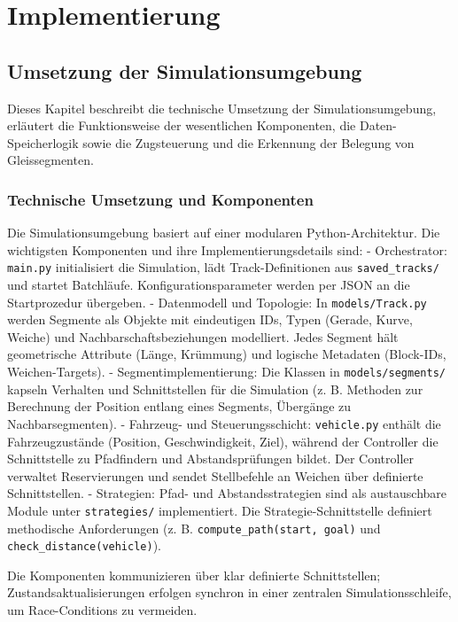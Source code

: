 \chapter{Implementierung}

\section{Umsetzung der Simulationsumgebung}
\label{ch:Implementierung:sec:Umsetzung der Simulationsumgebung}

Dieses Kapitel beschreibt die technische Umsetzung der Simulationsumgebung, erläutert die Funktionsweise der wesentlichen Komponenten, die Daten-Speicherlogik sowie die Zugsteuerung und die Erkennung der Belegung von Gleissegmenten.

\subsection*{Technische Umsetzung und Komponenten}
Die Simulationsumgebung basiert auf einer modularen Python-Architektur. Die wichtigsten Komponenten und ihre Implementierungsdetails sind:
- Orchestrator: \texttt{main.py} initialisiert die Simulation, lädt Track-Definitionen aus \texttt{saved\_tracks/} und startet Batchläufe. Konfigurationsparameter werden per JSON an die Startprozedur übergeben.
- Datenmodell und Topologie: In \texttt{models/Track.py} werden Segmente als Objekte mit eindeutigen IDs, Typen (Gerade, Kurve, Weiche) und Nachbarschaftsbeziehungen modelliert. Jedes Segment hält geometrische Attribute (Länge, Krümmung) und logische Metadaten (Block-IDs, Weichen-Targets).
- Segmentimplementierung: Die Klassen in \texttt{models/segments/} kapseln Verhalten und Schnittstellen für die Simulation (z. B. Methoden zur Berechnung der Position entlang eines Segments, Übergänge zu Nachbarsegmenten).
- Fahrzeug- und Steuerungsschicht: \texttt{vehicle.py} enthält die Fahrzeugzustände (Position, Geschwindigkeit, Ziel), während der Controller die Schnittstelle zu Pfadfindern und Abstandsprüfungen bildet. Der Controller verwaltet Reservierungen und sendet Stellbefehle an Weichen über definierte Schnittstellen.
- Strategien: Pfad- und Abstandsstrategien sind als austauschbare Module unter \texttt{strategies/} implementiert. Die Strategie-Schnittstelle definiert methodische Anforderungen (z. B. \texttt{compute\_path(start, goal)} und \texttt{check\_distance(vehicle)}).

Die Komponenten kommunizieren über klar definierte Schnittstellen; Zustandsaktualisierungen erfolgen synchron in einer zentralen Simulationsschleife, um Race-Conditions zu vermeiden.


